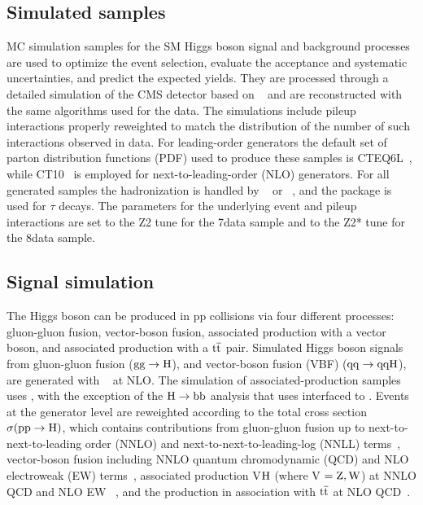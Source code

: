 \documentclass[11pt,twoside,a4paper,cmspaper,final,collab]{cms-tdr}
\begin{document}
\subsection{Simulated samples}

MC simulation samples for the SM Higgs boson signal and background processes are used
to optimize the event selection, evaluate the acceptance and systematic uncertainties, and
predict the expected yields.
They are processed through a detailed simulation of the CMS detector based on
\GEANTfour~\cite{Agostinelli:2002hh} and are reconstructed with the same algorithms used for the data.
The simulations include pileup interactions properly reweighted to match the
distribution of the number of such interactions observed in data.
For leading-order generators the default set of parton distribution functions
(PDF) used to produce these samples is CTEQ6L~\cite{CTEQ6L1}, while
CT10~\cite{Guzzi:2011sv} is employed for next-to-leading-order (NLO) generators.
For all generated samples the hadronization is handled by {} ~\cite{Sjostrand:2006za}
or \HERWIG{++}~\cite{Gieseke:2006ga}, and the \TAUOLA \cite{TAUOLA} package is used for $\tau$ decays.
The {\PYTHIA} parameters for the underlying event and pileup interactions are set to the {Z2} tune \cite{1107.0330} for the
7\TeV data sample and to the {Z2*} tune \cite{1107.0330} for the 8\TeV data sample.

\subsection{Signal simulation}

The Higgs boson can be produced in pp collisions via four different processes:
gluon-gluon fusion, vector-boson fusion, associated production with a vector boson, and associated production with
a $\mathrm{t}\overline{\mathrm{t}}$ pair.
Simulated Higgs boson signals from gluon-gluon fusion ($\mathrm{g}\mathrm{g} \rightarrow \mathrm{H}$),
and vector-boson fusion (VBF) ($\mathrm{q}\mathrm{q} \rightarrow \mathrm{q}\mathrm{q} \mathrm{H}$), are generated with
{\POWHEG}~\cite{powheg,powheg1,powheg2} at NLO.
The simulation of associated-production samples uses {\PYTHIA},
with the exception of  the  $\mathrm{H}\to\mathrm{b}\mathrm{b}$ analysis that uses {\POWHEG} interfaced to \HERWIG{++}.
Events at the generator level are reweighted according to the total cross section $\sigma(\mathrm{p}\mathrm{p}\rightarrow \mathrm{H})$,
which contains contributions from gluon-gluon fusion up to next-to-next-to-leading order (NNLO) and next-to-next-to-leading-log (NNLL) terms~\cite{LHCHiggsCrossSectionWorkingGroup:2011ti,deFlorian:2012yg,
Anastasiou:2012hx,Anastasiou:2008tj,deFlorian:2009hc,Baglio:2010ae,Djouadi:1991tka,Dawson:1990zj,Spira:1995rr,
Harlander:2002wh,Anastasiou:2002yz,Ravindran:2003um,Catani:2003zt,Actis:2008ug,Aglietti:2004nj,Degrassi:2004mx},
vector-boson fusion including NNLO quantum chromodynamic (QCD) and NLO
electroweak (EW)
terms~\cite{LHCHiggsCrossSectionWorkingGroup:2011ti,Ciccolini:2007jr,Ciccolini:2007ec,Figy:2003nv,Arnold:2008rz,Bolzoni:2010xr},
associated production V$\mathrm{H}$ (where V $= \mathrm{Z},\mathrm{W}$) at NNLO QCD and
NLO EW ~\cite{Han:1991ia,Brein:2003wg,Ciccolini:2003jy,Hamberg:1990np,Denner:2011id,Ferrera:2011bk},
and the production in association with $\mathrm{t}\overline{\mathrm{t}}$ at NLO QCD~\cite{Beenakker:2001rj,Beenakker:2002nc,Dawson:2002tg,Dawson:2003zu}.
\end{document}
